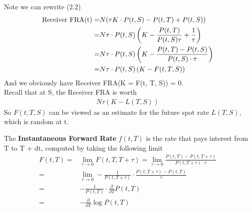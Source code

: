 Note we can rewrite (2.2)
\begin{align}
    \text{Receiver FRA(t)} 
    =& N (\tau K \cdot P(t, S) - P(t, T) + P(t, S)) \notag \\
    =& N \tau \cdot P(t, S) \left( K - \frac{P(t, T)}{P(t, S) \tau} + \frac{1}{\tau}\right) \notag \\  
    =& N \tau \cdot P(t, S) \left( K - \frac{P(t, T) - P(t, S)}{P(t, S) \cdot \tau}\right) \notag \\
    =& N \tau \cdot P(t, S) \left( K - F(t, T, S) \right)
\end{align}
And we obviously have Receiver FRA(K = F(t, T, S)) = 0. \\
Recall that at S, the Receiver FRA is worth 
\begin{align*}
    N \tau (K - L(T, S))  
\end{align*}
So $ F(t, T, S) $ can be viewed as an estimate for the future spot rate $L(T, S)$, which is random at t.

\begin{definition}
    The \textbf{Instantaneous Forward Rate} $f(t, T)$ is the rate that pays interest from T to T + dt, computed by taking the following limit \\
    \begin{align*}
        F(t, T) =& \lim_{\tau \to 0} F(t, T, T + \tau) = \lim_{\tau \to 0} \frac{P(t, T) - P(t, T + \tau)}{P(t, T + \tau) \cdot \tau} \\
        =& \lim_{\tau \to 0} -\frac{1}{P(t, T + \tau)} \cdot \frac{P(t, T + \tau) - P(t, T)}{\tau}  \\
        =& -\frac{1}{P(t, T)} \cdot \frac{\partial}{\partial T} P(t, T) \\
        =& -\frac{\partial}{\partial T} \log P(t, T)
    \end{align*}
\end{definition}

